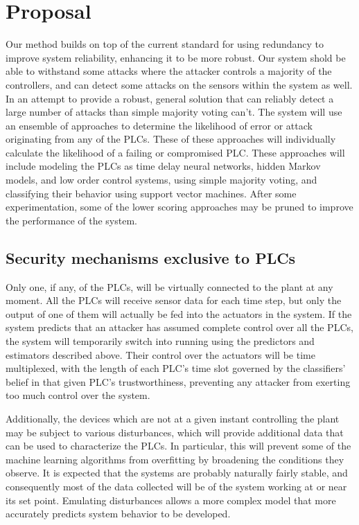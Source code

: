 \documentclass[10pt,twocolumn]{IEEEtran}
\begin{document}
\section{Proposal}
Our method builds on top of the current standard for using redundancy to improve system reliability, enhancing it to be more robust.
Our system shold be able to withstand some attacks where the attacker controls a majority of the controllers, and can detect some attacks on the sensors within the system as well.
In an attempt to provide a robust, general solution that can reliably detect a large number of attacks than simple majority voting can't.
The system will use an ensemble of approaches to determine the likelihood of error or attack originating from any of the PLCs.
These of these approaches will individually calculate the likelihood of a failing or compromised PLC.
These approaches will include modeling the PLCs as time delay neural networks, hidden Markov models, and low order control systems, using simple majority voting, and classifying their behavior using support vector machines.
After some experimentation, some of the lower scoring approaches may be pruned to improve the performance of the system.

\subsection{Security mechanisms exclusive to PLCs}
Only one, if any, of the PLCs, will be virtually connected to the plant at any moment.
All the PLCs will receive sensor data for each time step, but only the output of one of them will actually be fed into the actuators in the system.
If the system predicts that an attacker has assumed complete control over all the PLCs, the system will temporarily switch into running using the predictors and estimators described above.
Their control over the actuators will be time multiplexed, with the length of each PLC's time slot governed by the classifiers' belief in that given PLC's trustworthiness, preventing any attacker from exerting too much control over the system.

Additionally, the devices which are not at a given instant controlling the plant may be subject to various disturbances, which will provide additional data that can be used to characterize the PLCs.
In particular, this will prevent some of the machine learning algorithms from overfitting by broadening the conditions they observe.
It is expected that the systems are probably naturally fairly stable, and consequently most of the data collected will be of the system working at or near its set point.
Emulating disturbances allows a more complex model that more accurately predicts system behavior to be developed.
\end{document}
